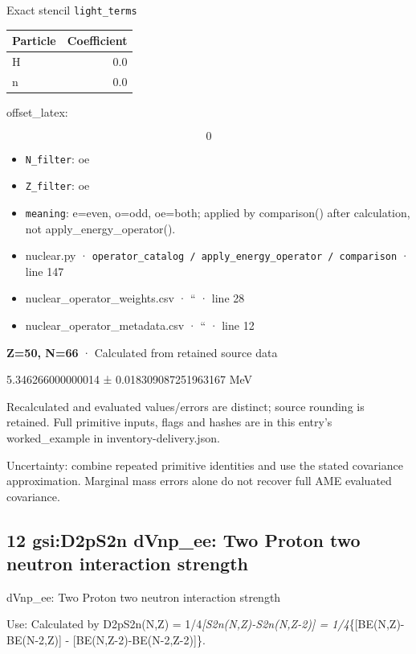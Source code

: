 \documentclass[
  11pt,
  letterpaper,
]{article}
\begin{document}
Exact stencil \texttt{light\_terms}

\begin{longtable}[]{@{}lr@{}}
\toprule\noalign{}
Particle & Coefficient \\
\midrule\noalign{}
\endhead
\bottomrule\noalign{}
\endlastfoot
H & 0.0 \\
n & 0.0 \\
\end{longtable}

offset\_latex:

\[
0
\]

\begin{itemize}
\item
  \texttt{N\_filter}: oe
\item
  \texttt{Z\_filter}: oe
\item
  \texttt{meaning}: e=even, o=odd, oe=both; applied by comparison()
  after calculation, not apply\_energy\_operator().
\item
  nuclear.py ·
  \texttt{operator\_catalog\ /\ apply\_energy\_operator\ /\ comparison}
  · line 147
\item
  nuclear\_operator\_weights.csv · `` · line 28
\item
  nuclear\_operator\_metadata.csv · `` · line 12
\end{itemize}

\textbf{Z=50, N=66} · Calculated from retained source data

5.346266000000014 ± 0.018309087251963167 MeV

Recalculated and evaluated values/errors are distinct; source rounding
is retained. Full primitive inputs, flags and hashes are in this entry's
worked\_example in inventory-delivery.json.

Uncertainty: combine repeated primitive identities and use the stated
covariance approximation. Marginal mass errors alone do not recover full
AME evaluated covariance.

\subsection{12 gsi:D2pS2n dVnp\_ee: Two Proton two neutron interaction
strength}\label{gsid2ps2n-dvnp_ee-two-proton-two-neutron-interaction-strength}

dVnp\_ee: Two Proton two neutron interaction strength

Use: Calculated by D2pS2n(N,Z) = 1/4\emph{{[}S2n(N,Z)-S2n(N,Z-2){]} =
1/4}\{{[}BE(N,Z)-BE(N-2,Z){]} - {[}BE(N,Z-2)-BE(N-2,Z-2){]}\}.
\end{document}
